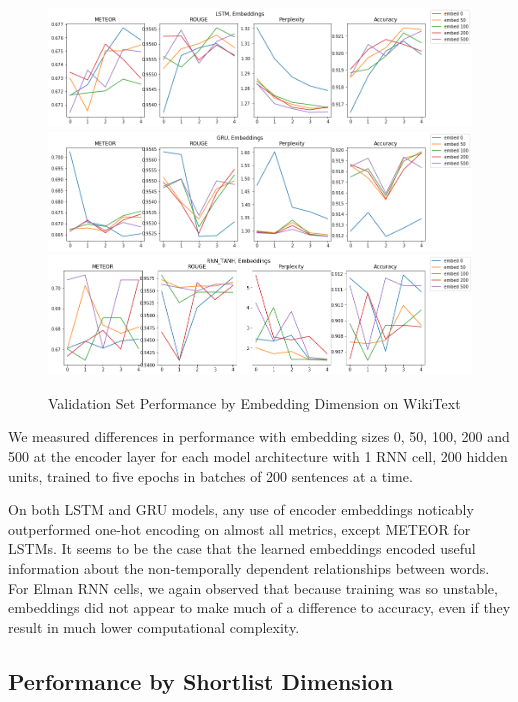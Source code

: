 \documentclass[a4paper]{article}
\begin{document}
\begin{figure}[!ht]
\includegraphics[width=0.7\columnwidth]{sr-perf-by-embedding-lstm}
\includegraphics[width=0.7\columnwidth]{sr-perf-by-embedding-gru}
\includegraphics[width=0.7\columnwidth]{sr-perf-by-embedding-rnn}
\centering
\caption{Validation Set Performance by Embedding Dimension on WikiText}
\end{figure}

We measured differences in performance with embedding sizes 0, 50,
100, 200 and 500 at the encoder layer for each model architecture with
1 RNN cell, 200 hidden units, trained to five epochs in batches of 200
sentences at a time.

On both LSTM and GRU models, any use of encoder embeddings noticably outperformed
one-hot encoding on almost all metrics, except METEOR for LSTMs. It seems to be
the case that the learned embeddings encoded useful information about the
non-temporally dependent relationships between words. For Elman RNN cells, we
again observed that because training was so unstable, embeddings did not
appear to make much of a difference to accuracy, even if they result in
much lower computational complexity.

\subsection{Performance by Shortlist Dimension}
\label{sec:perf_by_shortlist}
\end{document}

